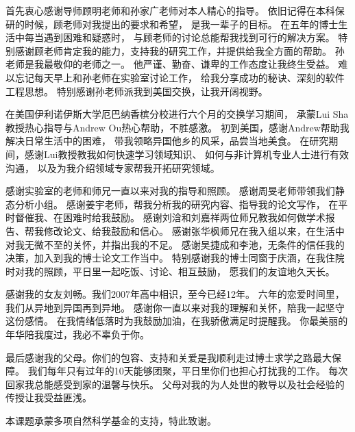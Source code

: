 \begin{acknowledgement}
  首先衷心感谢导师顾明老师和孙家广老师对本人精心的指导。
  依旧记得在本科保研的时候，顾老师对我提出的要求和希望，
  是我一辈子的目标。
  在五年的博士生活中每当遇到困难和疑惑时，
  与顾老师的讨论总能帮我找到可行的解决方案。
  特别感谢顾老师肯定我的能力，支持我的研究工作，并提供给我全方面的帮助。
  孙老师是我最敬仰的老师之一。
  他严谨、勤奋、谦卑的工作态度让我终生受益。
  难以忘记每天早上和孙老师在实验室讨论工作，
  给我分享成功的秘诀、深刻的软件工程思想。
  特别感谢孙老师派我到美国交换，让我开阔视野。

  
  在美国伊利诺伊斯大学厄巴纳香槟分校进行六个月的交换学习期间，
  承蒙Lui Sha教授热心指导与Andrew Ou热心帮助，不胜感激。
  初到美国，感谢Andrew帮助我解决日常生活中的困难，
  带我领略异国他乡的风采，品尝当地美食。
  在研究期间，感谢Lui教授教我如何快速学习领域知识、
  如何与非计算机专业人士进行有效沟通，
  以及为我介绍领域专家帮我开拓研究领域。
  

  感谢实验室的老师和师兄一直以来对我的指导和照顾。
  感谢周旻老师带领我们静态分析小组。
  感谢姜宇老师，帮我分析我的研究内容、指导我的论文写作，
  在平时督催我、在困难时给我鼓励。
  感谢刘浛和刘嘉祥两位师兄教我如何做学术报告、帮我修改论文、给我鼓励和信心。
  感谢张华枫师兄在我入组以来，在生活中对我无微不至的关怀，并指出我的不足。  
  感谢吴捷成和李池，无条件的信任我的决策，加入到我的博士论文工作当中。
  特别感谢我的博士同窗于庆涵，在我住院时对我的照顾，平日里一起吃饭、讨论、相互鼓励，
  愿我们的友谊地久天长。
  
  
  感谢我的女友刘畅。我们2007年高中相识，至今已经12年。
  六年的恋爱时间里，我们从异地到异国再到异地。
  感谢你一直以来对我的理解和关怀，陪我一起坚守这份感情。
  在我情绪低落时为我鼓励加油，在我骄傲满足时提醒我。
  你最美丽的年华陪我度过，我必不辜负于你。
  
  最后感谢我的父母。你们的包容、支持和关爱是我顺利走过博士求学之路最大保障。
  我们每年只有过年的10天能够团聚，平日里你们也担心打扰我的工作。
  每次回家我总能感受到家的温馨与快乐。
  父母对我的为人处世的教导以及社会经验的传授让我受益匪浅。
  
  本课题承蒙多项自然科学基金的支持，特此致谢。
\end{acknowledgement}
